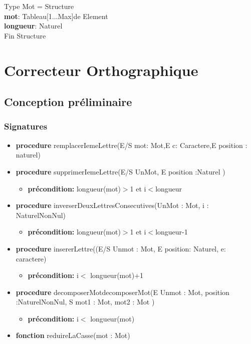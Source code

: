 \documentclass{article}
\begin{document}
    \pagestyle{empty}
    \noindent
    Type Mot = Structure \\
    \textbf{mot}: Tableau[1...Max]de Element \\
    \textbf{longueur}: Naturel\\
    Fin Structure

    \section*{Correcteur Orthographique}
    \subsection*{Conception préliminaire}
   
    \subsubsection*{Signatures}

	\begin{itemize}[label=$\ $, leftmargin=1cm]
		 \item \textbf{procedure} remplacerIemeLettre(E/S mot: Mot,E c: Caractere,E position : naturel)
		 \item \textbf{procedure} supprimerIemeLettre(E/S UnMot, E position :Naturel )
		 \begin{itemize}[label=$| $]
            \item \textbf{précondition:} longueur(mot)$>$1 et i$<$longueur
         \end{itemize}
		 \item \textbf{procedure} inverserDeuxLettresConsecutives(UnMot : Mot, i : NaturelNonNul)
		 \begin{itemize}[label=$| $]
            \item \textbf{précondition:} longueur(mot)$>$1 et i$<$longueur-1
         \end{itemize}
		 
		 \item \textbf{procedure} insererLettre((E/S Unmot : Mot, E position: Naturel, e: caractere)
		 \begin{itemize}[label=$| $]
            \item \textbf{précondition:} i$<$ longueur(mot)+1
         \end{itemize}
         \item \textbf{procedure} decomposerMotdecomposerMot(E Unmot : Mot, position :NaturelNonNul, S mot1 : Mot, mot2 : Mot )
		 \begin{itemize}[label=$| $]
            \item \textbf{précondition:} i$<$ longueur(mot)
         \end{itemize}
         \item \textbf{fonction} reduireLaCasse(mot : Mot)
        
	\end{itemize} 
    
\end{document}
